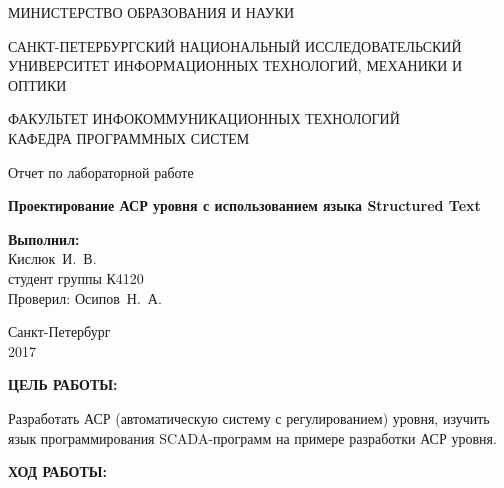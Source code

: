 \documentclass[14pt,a4paper]{extreport}
\newcommand{\header}[1]{%
{
\clearpage%
\fontsize{16pt}{14pt}\selectfont
\begin{center}
\textbf{\MakeUppercase{#1}:}
\end{center}
}
}
\newcommand{\labyear}{2017}
\newcommand{\labtitle}{Проектирование АСР уровня с использованием языка Structured Text}
\newcommand{\prepod}{Осипов~Н.~А.}
\newcommand{\student}{Кислюк~И.~В.}
\begin{document}
	\begin{titlepage}
	\begin{center}	
		\fontsize{14pt}{14pt}\selectfont
		МИНИСТЕРСТВО ОБРАЗОВАНИЯ И НАУКИ\\

		\vspace*{0.6\baselineskip}

		\MakeUppercase{Санкт-Петербургский Национальный Исследовательский Университет Информационных технологий, механики и оптики}		
		
		\vspace*{0.6\baselineskip}
		\MakeUppercase{Факультет Инфокоммуникационных технологий}\\
		\MakeUppercase{Кафедра программных систем}
	
		\vspace*{7\baselineskip}
		\fontsize{19pt}{18pt}\selectfont
		Отчет по лабораторной работе
		
		\fontsize{20pt}{18pt}\selectfont
		\textbf{\labtitle}\\
		\vspace*{1.15\baselineskip}
		\end{center}
	
	\vspace*{2\baselineskip}
	\begin{flushright}
	\fontsize{14pt}{14pt}\selectfont
	\textbf{Выполнил:}\\
	\student\\
	студент группы К4120\\
	Проверил: \prepod\\
	\end{flushright}
	
	\vspace{\fill}
	\begin{center}
	Санкт-Петербург\\
	\vspace{-1ex}
	\labyear
	\end{center}
	
\end{titlepage}

\fontsize{14pt}{14pt}\selectfont

\header{Цель работы}


Разработать АСР (автоматическую систему с регулированием) уровня, изучить язык программирования SCADA-программ на примере разработки АСР уровня.

\header{Ход работы}
\end{document}
